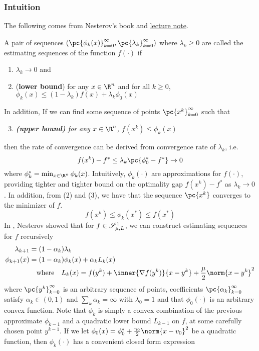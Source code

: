\documentclass[../summary.tex]{subfiles}
\begin{document}
\subsubsection{Intuition}

The following comes from Nesterov's book \cite{nesterovIntroductoryLecturesConvex2004} and \href{https://nisheethvishnoi.files.wordpress.com/2018/05/lecture52.pdf}{lecture note}.
\begin{definition*}
    A pair of sequences $(\pc{\phi_k(x)}_{k=0}^{\infty}, \pc{\lambda_k}_{k=0}^{\infty})$ where $\lambda_k \geq 0$ are called the estimating sequences of the function $f(\cdot)$ if 
    \begin{enumerate}
        \item $\lambda_k \to 0$ and
        \item (\textbf{lower bound}) for any $x\in\R^n$ and for all $k\geq 0$, $\phi_k(x) \leq (1-\lambda_k)f(x) + \lambda_k \phi_0(x)$ 
    \end{enumerate}
\end{definition*}
\noindent In addition, If we can find some sequence of points $\pc{x^k}_{k=0}^{\infty}$ such that
\begin{enumerate}
    \setcounter{enumi}{2}
    \item \textit{\textbf{(upper bound)} for any $x\in\R^n$, $f(x^k) \leq \phi_k(x)$}
\end{enumerate}
then the rate of convergence can be derived from convergence rate of $\lambda_k$, i.e. 
\[
    f(x^k) - f^* \leq \lambda_k \pc{ \phi_0^* - f^* } \to 0
\]
where $\phi_k^* = \min_{x\in\R^n} \phi_k(x)$. Intuitively, $\phi_k(\cdot)$ are approximations for $f(\cdot)$, providing tighter and tighter bound on the optimality gap $f(x^k) - f^*$ as $\lambda_k \to 0$. In addition, from (2) and (3), we have that the sequence $\pc{x^k}$ converges to the minimizer of $f$. 
\[
    f(x^k) \leq \phi_k(x^*) \leq f(x^*)   
\]
In \cite{nesterovIntroductoryLecturesConvex2004}, Nesterov showed that for $f\in\mathscr{S}_{\mu,L}^1$, we can construct estimating sequences for $f$ recursively
\begin{align*}
    \lambda_{k+1}
        &= (1-\alpha_k) \lambda_k \\
    \phi_{k+1}(x)
        &= (1-\alpha_k) \phi_k(x) + \alpha_k L_k(x) \\
        &\quad \text{where} \quad 
        L_k(x) = f(y^k) + \inner{\nabla f(y^k)}{x - y^k} + \frac{\mu}{2} \norm{x-y^k}^2
\end{align*}
where $\pc{y^k}_{k=0}^{\infty}$ is an arbitrary sequence of points, coefficients $\pc{\alpha_k}_{k=0}^{\infty}$ satisfy $\alpha_k \in (0,1)$ and $\sum_k \alpha_k = \infty$ with $\lambda_0 = 1$ and that $\phi_0(\cdot)$ is an arbitrary convex function. Note that $\phi_k$ is simply a convex combination of the previous approximate $\phi_{k-1}$ and a quadratic lower bound $L_{k-1}$ on $f$, at some carefully chosen point $y^{k-1}$. If we let $\phi_0(x) = \phi_0^* + \frac{\gamma_0}{2} \norm{x-v_0}^2$ be a quadratic function, then $\phi_k(\cdot)$ has a convenient closed form expression
\end{document}
